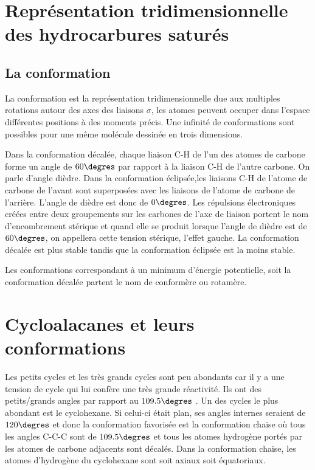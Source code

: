 \section{Représentation tridimensionnelle des hydrocarbures saturés}

\subsection{La conformation}
La conformation est la représentation tridimensionnelle due aux multiples rotations autour des axes des liaisons $\sigma$, les atomes peuvent occuper dans l'espace différentes positions à des moments précis.
Une infinité de conformations sont possibles pour une même molécule dessinée en trois dimensions.

Dans la conformation décalée, chaque liaison C-H de l'un des atomes de carbone forme un angle de $60\degres$ par rapport à la liaison C-H de l'autre carbone.
On parle d'angle dièdre.
Dans la conformation éclipsée,les liaisons C-H de l'atome de carbone de l'avant sont superposées avec les liaisons de l'atome de carbone de l'arrière.
L'angle de dièdre est donc de $0\degres$.
Les répulsions électroniques créées entre deux groupements sur les carbones de l'axe de liaison portent le nom d'encombrement stérique et quand elle se produit lorsque l'angle de dièdre est de $60\degres$, on appellera cette tension stérique, l'effet gauche.
La conformation décalée est plus stable tandis que la conformation éclipsée est la moins stable.

Les conformations correspondant à un minimum d'énergie potentielle, soit la conformation décalée partent le nom de conformère ou rotamère.


\section{Cycloalacanes et leurs conformations}
Les petits cycles et les très grands cycles sont peu abondants car il y a une tension de cycle qui lui confère une très grande réactivité.
Ils ont des petits/grands angles par rapport au $109.5\degres$ .
Un des cycles le plus abondant est le cyclohexane.
Si celui-ci était plan, ses angles internes seraient de $120\degres$ et donc la conformation favorisée est la conformation chaise où tous les angles C-C-C sont de $109.5\degres$ et tous les atomes hydrogène portés par les atomes de carbone adjacents sont décalés.
Dans la conformation chaise, les atomes d'hydrogène du cyclohexane sont soit axiaux soit équatoriaux.

